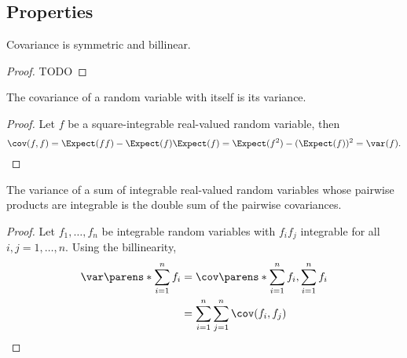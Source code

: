 \subsection{Properties}

\begin{prop}
Covariance is symmetric and billinear.
\begin{proof}
  TODO
\end{proof}
\end{prop}

\begin{prop}
The covariance of
a random variable
with itself is its variance.
\begin{proof}
  Let $f$ be a square-integrable
  real-valued random variable,
  then
  \[
    \cov(f, f) = \Expect(ff) - \Expect(f)\Expect(f) = \Expect(f^2) - (\Expect(f))^2 = \var(f).
  \]
\end{proof}
\end{prop}

\begin{prop}
The variance of a
sum of integrable
real-valued random variables
whose pairwise products
are integrable
is the double sum of
the pairwise covariances.
\begin{proof}
Let $f_1, \dots, f_n$
be integrable
random variables
with $f_if_j$ integrable
for all $i,j = 1, \dots, n$.
Using the billinearity,
\[
  \begin{aligned}
  \var\parens*{\sum_{i = 1}^{n} f_i}
  &= \cov\parens*{\sum_{i = 1}^{n} f_i, \sum_{i = 1}^{n}f_i} \\
    &= \sum_{i = 1}^{n} \sum_{j = 1}^{n} \cov(f_i, f_j)
  \end{aligned}
\]
\end{proof}
\end{prop}
\strats
